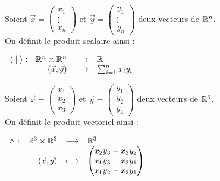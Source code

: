 \begin{definition} 
	Soient $\vec{x} = \begin{pmatrix} x_1 \\ \vdots \\ x_n \end{pmatrix}$ et $\vec{y} = \begin{pmatrix} y_1 \\ \vdots \\ y_n \end{pmatrix}$ deux vecteurs de $\mathbb{R}^n$.
	\\
	On définit le produit scalaire ainsi :
	\begin{center}
		$
		\begin{array}{rrcl} \langle \cdot | \cdot \rangle : & \mathbb{R}^n \times \mathbb{R}^n & \longrightarrow & \mathbb{R} \\ & (\vec{x}, \vec{y}) & \longmapsto & \sum_{i = 1}^n x_i y_i \end{array}
		$
	\end{center}
\end{definition}

\begin{definition}
	Soient $\vec{x} = \begin{pmatrix} x_1 \\ x_2 \\ x_3 \end{pmatrix}$ et $\vec{y} = \begin{pmatrix} y_1 \\ y_2 \\ y_3 \end{pmatrix}$ deux vecteurs de $\mathbb{R}^3$.
	\\
	On définit le produit vectoriel ainsi :
	\begin{center}
		$
		\begin{array}{rrcl} \wedge : & \mathbb{R}^3 \times \mathbb{R}^3 & \longrightarrow & \mathbb{R}^3 \\ & (\vec{x}, \vec{y}) & \longmapsto & 
		\begin{pmatrix}
			x_2 y_3 - x_3 y_2 \\
			x_1 y_3 - x_3 y_1 \\
			x_1 y_2 - x_2 y_1
		\end{pmatrix}
		 \end{array}
		$
	\end{center}
\end{definition}
